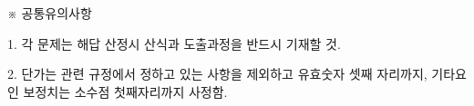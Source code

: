 \begin{framedtext}
※ 공통유의사항 \par
1. 각 문제는 해답 산정시 산식과 도출과정을 반드시 기재할 것. \par
2. 단가는 관련 규정에서 정하고 있는 사항을 제외하고 유효숫자 셋째 자리까지, 기타요인 보정치는 소수점 첫째자리까지 사정함.
\end{framedtext}
